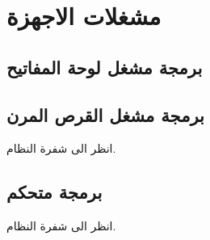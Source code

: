 \documentclass[document.tex]{subfiles}
\begin{document}
\chapter{مشغلات الاجهزة }
\section{برمجة مشغل لوحة المفاتيح }

\section{برمجة مشغل القرص المرن }
انظر الى شفرة النظام.
\section{برمجة متحكم  }
انظر الى شفرة النظام.
\end{document}
